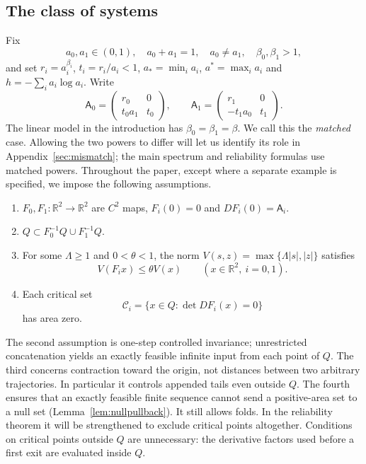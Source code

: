 \documentclass[11pt]{amsart}
\theoremstyle{definition}
\theoremstyle{remark}
\newcommand{\R}{\mathbb R}
\numberwithin{equation}{section}
\begin{document}
\subsection{The class of systems}
Fix
\begin{equation}\label{eq:parameters}
a_0,a_1\in(0,1),\quad a_0+a_1=1,\quad a_0\ne a_1,\quad
\beta_0,\beta_1>1,
\end{equation}
and set $r_i=a_i^{\beta_i}$, $t_i=r_i/a_i<1$,
$a_* =\min_i a_i$, $a^*=\max_i a_i$ and $h=-\sum_i a_i\log a_i$.
Write
\begin{equation}\label{eq:jets}
\mathsf A_0=\begin{pmatrix}r_0&0\\t_0a_1&t_0\end{pmatrix},
\qquad
\mathsf A_1=\begin{pmatrix}r_1&0\\-t_1a_0&t_1\end{pmatrix}.
\end{equation}
The linear model in the introduction has $\beta_0=\beta_1=\beta$.
We call this the \emph{matched} case. Allowing the two powers to differ
will let us identify its role in Appendix~\ref{sec:mismatch}; the
main spectrum and reliability formulas use matched powers.
Throughout the paper, except where a separate example is specified,
we impose the following assumptions.
\begin{enumerate}
\item $F_0,F_1:\R^2\to\R^2$ are $C^2$ maps,
$F_i(0)=0$ and $DF_i(0)=\mathsf A_i$.
\item $Q\subset F_0^{-1}Q\cup F_1^{-1}Q$.
\item For some $\Lambda\ge1$ and $0<\theta<1$, the norm
$V(s,z)=\max\{\Lambda|s|,|z|\}$ satisfies
\begin{equation}\label{eq:contract}
V(F_i x)\le\theta V(x)\qquad(x\in\R^2,\ i=0,1).
\end{equation}
\item Each critical set
\begin{equation}\label{eq:critical}
\mathcal C_i=\{x\in Q:\det DF_i(x)=0\}
\end{equation}
has area zero.
\end{enumerate}
The second assumption is one-step controlled invariance; unrestricted
concatenation yields an exactly feasible infinite input from each
point of $Q$. The third concerns contraction toward the origin,
not distances between two arbitrary trajectories. In particular it
controls appended tails even outside $Q$. The fourth ensures that
an exactly feasible finite sequence cannot
send a positive-area set to a null set (Lemma~\ref{lem:nullpullback}).
It still allows folds. In the reliability theorem it will be
strengthened to exclude critical points altogether. Conditions on
critical points outside $Q$ are unnecessary: the derivative factors
used before a first exit are evaluated inside $Q$.
\end{document}
